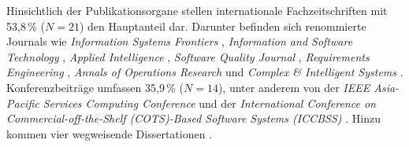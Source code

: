 Hinsichtlich der Publikationsorgane stellen internationale Fachzeitschriften mit 53,8\,\% ($N = 21$) den Hauptanteil dar. Darunter befinden sich renommierte Journals wie \textit{Information Systems Frontiers} \parencite{FCYW9EWJ}, \textit{Information and Software Technology} \parencite{8VHUMEKY}, \textit{Applied Intelligence} \parencite{B7ZTQCZZ, JX4RDRDU}, \textit{Software Quality Journal} \parencite{M3B2D3GD}, \textit{Requirements Engineering} \parencite{DAU8NSK8}, \textit{Annals of Operations Research} \parencite{YVWGHAWQ} und \textit{Complex \& Intelligent Systems} \parencite{UFCEV52H}. Konferenzbeiträge umfassen 35,9\,\% ($N = 14$), unter anderem von der \textit{IEEE Asia-Pacific Services Computing Conference} \parencite{MZ8JHDYA} und der \textit{International Conference on Commercial-off-the-Shelf (COTS)-Based Software Systems (ICCBSS)} \parencite{6RNULWVY}. Hinzu kommen vier wegweisende Dissertationen \parencite{ 9F79VAAB, WBGP3ETU, WZM7DUBY, RRU375GB}.

